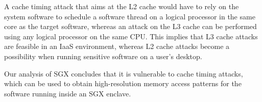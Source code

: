 
\begin{table}[hbt]
  \caption{
    Approximate sizes and access times for each level in the memory
    hierarchy of an Intel processor, from \cite{intel2010perfanalysis}. Memory
    sizes and access times differ by orders of magnitude across the different
    levels of the hierarchy. This table does not cover multi-processor systems.
  }
  \label{fig:cache_timings}
\end{table}

A cache timing attack that aims at the L2 cache would have to rely on the
system software to schedule a software thread on a logical processor in the
same core as the target software, whereas an attack on the L3 cache can be
performed using any logical processor on the same CPU. This implies that L3
cache attacks are feasible in an IaaS environment, whereas L2 cache attacks
become a possibility when running sensitive software on a user's desktop.

Our analysis of SGX concludes that it is vulnerable to cache timing attacks,
which can be used to obtain high-resolution memory access patterns for the
software running inside an SGX enclave.

